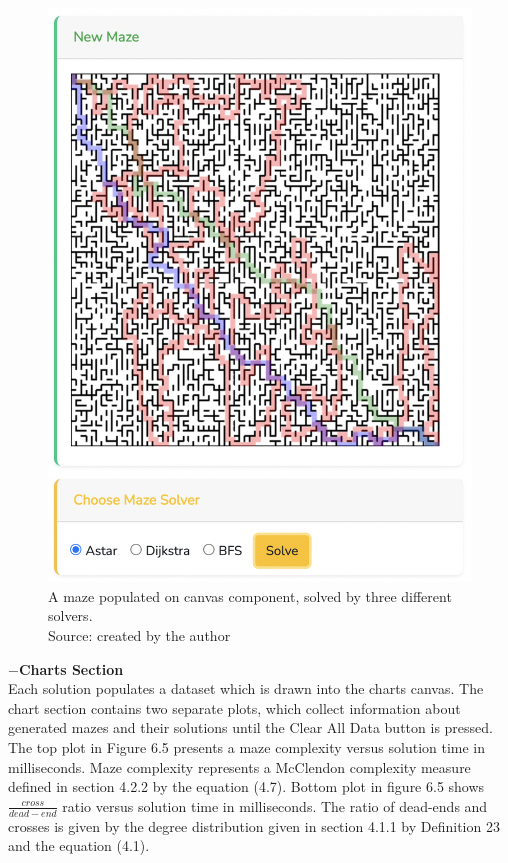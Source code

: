 \begin{figure}[!h]
    \centering
    \centering
    \includegraphics[scale =0.35 ]{mazeSolutions}
    \caption{A maze populated on canvas component, solved by three different solvers.\\Source: created by the author}
    \end{figure}
\newpage
\textbf{$-$Charts Section}\\
Each solution populates a dataset which is drawn into the charts canvas. The chart section contains two separate plots, which collect information about 
generated mazes and their solutions until the Clear All Data button is pressed. The top plot in Figure 6.5 presents a maze complexity versus solution time in milliseconds.
Maze complexity represents a McClendon complexity measure defined in section 4.2.2 by the equation (4.7). Bottom plot in figure 6.5 shows $\frac{cross}{dead-end}$
ratio versus solution time in milliseconds. The ratio of dead-ends and crosses is given by the degree distribution given in section 4.1.1 by Definition 23 and the equation (4.1).\\
